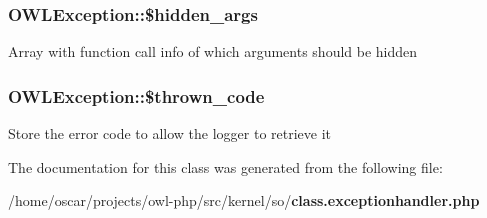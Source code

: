 \subsubsection[{\$hidden\_\-args}]{\setlength{\rightskip}{0pt plus 5cm}OWLException::\$hidden\_\-args\hspace{0.3cm}{\ttfamily  [private]}}\label{classOWLException_a6f55c054dd20e494abe9db9a9494bdda}
Array with function call info of which arguments should be hidden 
\subsubsection[{\$thrown\_\-code}]{\setlength{\rightskip}{0pt plus 5cm}OWLException::\$thrown\_\-code}\label{classOWLException_abd34d579d5f578f2e08a04c987dbea1a}
Store the error code to allow the logger to retrieve it 

The documentation for this class was generated from the following file:\begin{DoxyCompactItemize}
\item 
/home/oscar/projects/owl-\/php/src/kernel/so/{\bf class.exceptionhandler.php}\end{DoxyCompactItemize}
